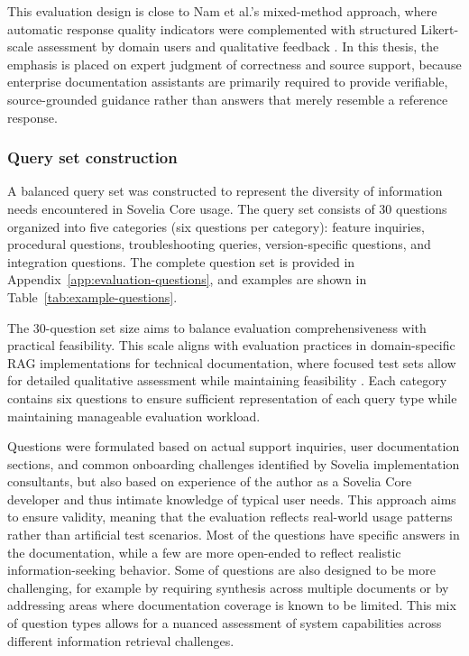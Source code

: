This evaluation design is close to Nam et al.'s mixed-method approach, where automatic response quality indicators were complemented with structured Likert-scale assessment by domain users and qualitative feedback \parencite{namLoRATunedMultimodalRAG2025}. In this thesis, the emphasis is placed on expert judgment of correctness and source support, because enterprise documentation assistants are primarily required to provide verifiable, source-grounded guidance rather than answers that merely resemble a reference response.

\subsubsection{Query set construction}

A balanced query set was constructed to represent the diversity of information needs encountered in Sovelia Core usage. The query set consists of 30 questions organized into five categories (six questions per category): feature inquiries, procedural questions, troubleshooting queries, version-specific questions, and integration questions. The complete question set is provided in Appendix~\ref{app:evaluation-questions}, and examples are shown in Table~\ref{tab:example-questions}.

The 30-question set size aims to balance evaluation comprehensiveness with practical feasibility. This scale aligns with evaluation practices in domain-specific RAG implementations for technical documentation, where focused test sets allow for detailed qualitative assessment while maintaining feasibility \parencite{namLoRATunedMultimodalRAG2025}. Each category contains six questions to ensure sufficient representation of each query type while maintaining manageable evaluation workload.

Questions were formulated based on actual support inquiries, user documentation sections, and common onboarding challenges identified by Sovelia implementation consultants, but also based on experience of the author as a Sovelia Core developer and thus intimate knowledge of typical user needs. This approach aims to ensure validity, meaning that the evaluation reflects real-world usage patterns rather than artificial test scenarios. Most of the questions have specific answers in the documentation, while a few are more open-ended to reflect realistic information-seeking behavior. Some of questions are also designed to be more challenging, for example by requiring synthesis across multiple documents or by addressing areas where documentation coverage is known to be limited. This mix of question types allows for a nuanced assessment of system capabilities across different information retrieval challenges.


